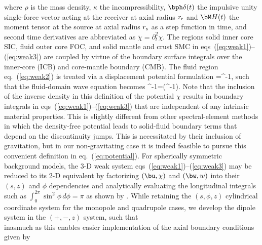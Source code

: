 \ena
%
where $\rho$ is the mass density, $\kappa$ the incompressibility,
$\bph\delta(t)$ the impulsive unity single-force vector acting at the
receiver at axial radius $r_{\rm r}$ and
$\bM H(t)$ the moment tensor at the source at axial radius $r_{\rm s}$ as a
step function in time, and second time derivatives are abbreviated as
$\ddot{\chi}=\partial^2_t{\chi}$.
The regions solid inner core SIC, fluid outer core FOC, and solid mantle and
crust SMC in eqs~(\ref{eq:weak1})--(\ref{eq:weak3}) are coupled by virtue of
the boundary surface integrals over the inner-core (ICB) and core-mantle
boundary (CMB). The fluid region eq.~(\ref{eq:weak2}) is treated via a
displacement potential formulation \citep{nissen+:07a}
%
\eq\label{eq:potential}
\bu=\rho^{-1}\bdel\chi,
\en
%
such that the fluid-domain wave equation becomes
\eq\label{eq:fluid_waveequation}
\kappa^{-1}\ddot{\chi}=\bdel\cdot(\rho^{-1}\bdel\chi).
\en
%
Note that the inclusion
of the inverse density in this definition of the potential $\chi$ results in
boundary integrals in eqs~(\ref{eq:weak1})--(\ref{eq:weak3}) that are
independent of any intrinsic material properties.
This is slightly different from other spectral-element methods
\citep{KoTr02a,manu04} in which the density-free potential leads
to solid-fluid boundary terms that depend on the discontinuity jumps.
This is necessitated by their inclusion of gravitation, but in our
non-gravitating case it is indeed feasible to pursue this convenient definition
in eq.~(\ref{eq:potential}).
For spherically symmetric background models, the 3-D weak system
eqs~(\ref{eq:weak1})--(\ref{eq:weak3}) may be reduced to its 2-D equivalent
by factorizing $(\bu,\chi)$ and $(\bw,w)$ into their $(s,z)$ and $\phi$
dependencies and analytically evaluating the longitudinal integrals
such as $\int_0^{2\pi}\sin^2{\phi}\,d\phi=\pi$ as shown by
\citet[][Section~4.4]{nissen+:07a}.
%
While retaining the $(s,\phi,z)$ cylindrical coordinate
system for the monopole and quadrupole cases, we develop the dipole system
in the $(+,-,z)$ system, such that
%
\eqa
{}\\
\ena
%
inasmuch as this enables easier implementation of
the axial boundary conditions given by
\eqa
{}
\ena
%

